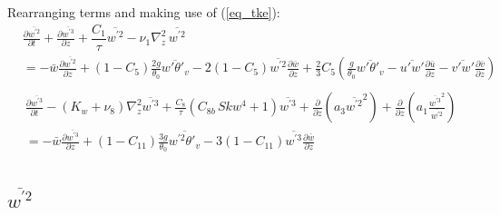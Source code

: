 \documentclass[11pt,fleqn]{article}
\newcommand{\ptlder}[2]{\frac{\partial #1}{\partial #2}}
\begin{document}
%
Rearranging terms and making use of (\ref{eq_tke}):
%
\begin{equation}
\label{eq_wp2c}
\begin{split}
& \ptlder{\overline{w^{'2}}}{t} 
  + \ptlder{\overline{w^{'3}}}{z} 
  + \dfrac{C_1}{\tau} \overline{w^{'2}} 
  - \nu_1 \nabla_z^2 \, \overline{w^{'2}} \\
& =
  - \bar{w}\ptlder{\overline{w^{'2}}}{z}	 
  + ( 1 - C_5 ) \frac{2g}{\theta_0} \overline{w'\theta'_v}
  - 2 ( 1 - C_5 ) \overline{w^{'2}}\ptlder{\bar{w}}{z}
  + \frac{2}{3} C_5
     \left(
       \frac{g}{\theta_0} \overline{w'\theta'_v} 
       - \overline{u'w'}\ptlder{\bar{u}}{z} 
       - \overline{v'w'}\ptlder{\bar{v}}{z} 
     \right) \\
\end{split}
\end{equation}
%
\begin{equation}
\label{eq_wp3c}
\begin{split}
& \ptlder{\overline{w^{'3}}}{t}
  - \left( K_w + \nu_8 \right) \nabla_z^2 \overline{w^{'3}}
  + \frac{C_8}{\tau}\left( C_{8b} \, Skw^4 + 1 \right) \overline{w^{'3}}
  + \ptlder{}{z} \left( a_3 \overline{w^{'2}}^2 \right)
  + \ptlder{}{z} 
       \left(
          a_1 \frac{ \overline{w^{'3}}^2 }{ \overline{w^{'2}} }
       \right) \\
& = 
  - \bar{w}\ptlder{\overline{w^{'3}}}{z}
  + (1 - C_{11}) \frac{3g}{\theta_0} \overline{w^{'2}\theta'_v}
  - 3 ( 1 - C_{11} ) \overline{w^{'3}}\ptlder{\bar{w}}{z} \\
\end{split}
\end{equation}
%

\subsection{$\overline{w^{'2}}$}
\end{document}
